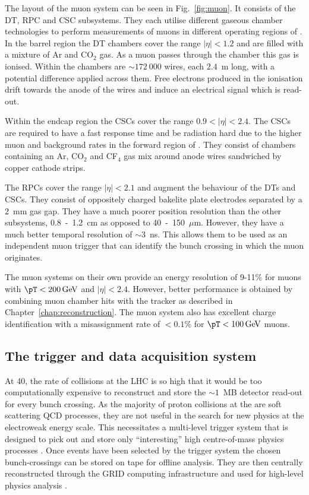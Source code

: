 The layout of the muon system can be seen in Fig.~\ref{fig:muon}. It
consists of the \ac{DT}, \ac{RPC} and \ac{CSC} subsystems. They each
utilise different gaseous chamber technologies to perform measurements
of muons in different operating regions of \CMS. In the barrel region
the \ac{DT} chambers cover the range $|\eta|<1.2$ and are
filled with a mixture of Ar and CO$_2$ gas. As a muon
passes through the chamber this gas is ionised. Within the chambers
are $\sim172~000$ wires, each $2.4$~m long, with a potential difference
applied across them. Free electrons produced in the ionisation drift
towards the anode of the wires and induce an electrical signal which
is read-out. 

Within the endcap region the \ac{CSC}s cover the range
$0.9<|\eta|<2.4$. The \ac{CSC}s are required to have a fast response
time and be radiation hard due to the higher muon and background rates
in the forward region of \CMS. They consist of chambers containing an
Ar, CO$_2$ and CF$_4$ gas mix around anode wires sandwiched by copper
cathode strips.

The \ac{RPC}s cover the range $|\eta|<2.1$ and augment the behaviour
of the \ac{DT}s and \ac{CSC}s. They consist of oppositely charged
bakelite plate electrodes separated by a 2~mm gas gap. They have a
much poorer position resolution than the other subsystems, 0.8~-~1.2~cm
as opposed to 40~-~150~$\mu$m. However, they have a much better temporal
resolution of $\sim3$~ns. This allows them to be used as an
independent muon trigger that can identify the bunch crossing in which
the muon originates.

The muon systems on their own provide an energy resolution of 9-11\%
for muons with $\pT<200\gev$ and $|\eta|<2.4$. However, better
performance is obtained by combining muon chamber hits with the
tracker as described in Chapter~\ref{chap:reconstruction}. The muon
system also has excellent charge identification with a misassignment
rate of $<0.1\%$ for $\pT<100\gev$ muons.

\subsection{The trigger and data acquisition system}
\label{sec:triggers} 

At 40\mhz, the rate of collisions at the LHC is so high that it would
be too computationally expensive to reconstruct and store the
$\sim1$~MB detector read-out for every bunch crossing. As the majority
of proton collisions at the \LHC are soft scattering QCD processes,
they are not useful in the search for new physics at the electroweak
energy scale. This necessitates a multi-level trigger system that is
designed to pick out and store only ``interesting'' high
centre-of-mass physics processes
\cite{Tapper:1556311,Bayatyan:706847}. Once events have been
selected by the trigger system the chosen bunch-crossings can be
stored on tape for offline analysis. They are then centrally
reconstructed through the GRID computing infrastructure and used for
high-level physics analysis \cite{Bayatyan:838359}.

